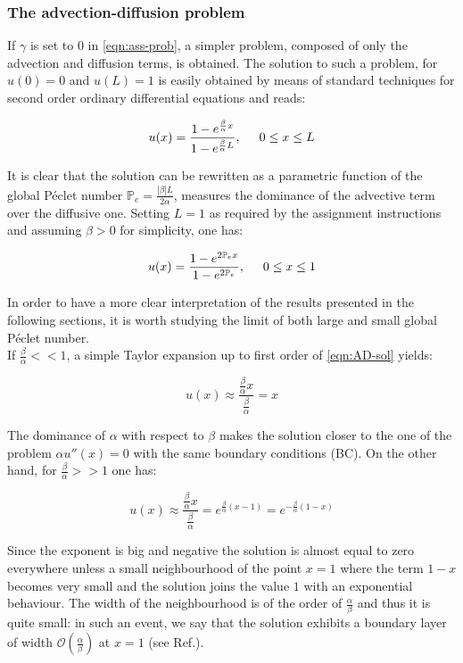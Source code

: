 \documentclass[11pt]{article}
\theoremstyle{theorem}
\theoremstyle{definition}
\begin{document}
\subsubsection{The advection-diffusion problem}
\label{subsubsec:ADprob}
If $\gamma$ is set to $0$ in \eqref{eqn:ass-prob}, a simpler problem, composed of only the advection and diffusion terms, is obtained. The solution to such a problem, for $u(0)=0$ and $u(L)=1$ is easily obtained by means of standard techniques for second order ordinary differential equations and reads:

\begin{align}
	\label{eqn:AD-sol}
	u(x)=\frac{1-e^{\frac{\beta}{\alpha}x}}{1-e^{\frac{\beta}{\alpha}L}},\hspace{5mm} 0\le x\le L
\end{align}

It is clear that the solution can be rewritten as a parametric function of the global P\'{e}clet number $\mathbb{P}_e=\frac{|\beta|L}{2\alpha}$, measures the dominance of the advective term over the diffusive one. Setting $L=1$ as required by the assignment instructions and assuming $\beta>0$ for simplicity, one has:

$$	u(x)=\frac{1-e^{2\mathbb{P}_ex}}{1-e^{2\mathbb{P}_e}}, \hspace{5mm} 0\le x\le 1 $$

In order to have a more clear interpretation of the results presented in the following sections, it is worth studying the limit of both large and small global P\'{e}clet number.\\
If $\frac{\beta}{\alpha}<<1$, a simple Taylor expansion up to first order of \eqref{eqn:AD-sol} yields:

\begin{equation}
	\label{key:AD-smallP}
	u(x)\approx\frac{\frac{\beta}{\alpha}x}{\frac{\beta}{\alpha}}=x
\end{equation}

The dominance of $\alpha$ with respect to $\beta$ makes the solution closer to the one of the problem $\alpha u''(x)=0$ with the same boundary conditions (BC). On the other hand, for $\frac{\beta}{\alpha}>>1$ one has:

\begin{equation}
\label{key:AD-bigP}
u(x)\approx\frac{\frac{\beta}{\alpha}x}{\frac{\beta}{\alpha}}=e^{\frac{\beta}{\alpha}(x-1)}=e^{-\frac{\beta}{\alpha}(1-x)}
\end{equation}

Since the exponent is big and negative the solution is almost equal to zero everywhere unless a small neighbourhood of the point $x=1$ where the term $ 1-x $ becomes very small and the solution joins the value $1$ with an exponential behaviour. The width of the neighbourhood is of the order of $\frac{\alpha}{\beta}$ and thus it is quite small: in such an event, we say that the solution exhibits a boundary layer of width $\mathcal{O}\left(\frac{\alpha}{\beta}\right)$ at $x=1$ (see Ref.\cite{numerical-math}).
\end{document}
